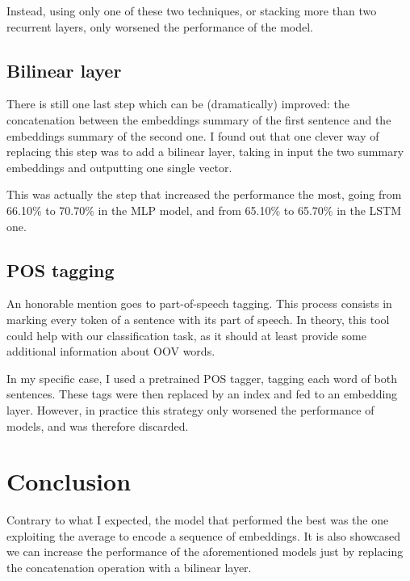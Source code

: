 \documentclass[11pt,a4paper]{article}
\begin{document}
	 Instead, using only one of these two techniques, or stacking more than two recurrent layers, only worsened the performance of the model.
	
	\subsection{Bilinear layer}
	There is still one last step which can be (dramatically) improved: the concatenation between the embeddings summary of the first sentence and the embeddings summary of the second one. I found out that one clever way of replacing this step was to add a bilinear layer, taking in input the two summary embeddings and outputting one single vector.
	
	This was actually the step that increased the performance the most, going from 66.10\% to 70.70\% in the MLP model, and from 65.10\% to 65.70\% in the LSTM one.
	
	\subsection{POS tagging}
	An honorable mention goes to part-of-speech tagging. This process consists in marking every token of a sentence with its part of speech. In theory, this tool could help with our classification task, as it should at least provide some additional information about OOV words.
	
	In my specific case, I used a pretrained POS tagger, tagging each word of both sentences. These tags were then replaced by an index and fed to an embedding layer. However, in practice this strategy only worsened the performance of models, and was therefore discarded.
	
	\section{Conclusion}
	Contrary to what I expected, the model that performed the best was the one exploiting the average to encode a sequence of embeddings. It is also showcased we can increase the performance of the aforementioned models just by replacing the concatenation operation with a bilinear layer.
	\clearpage
\end{document}
